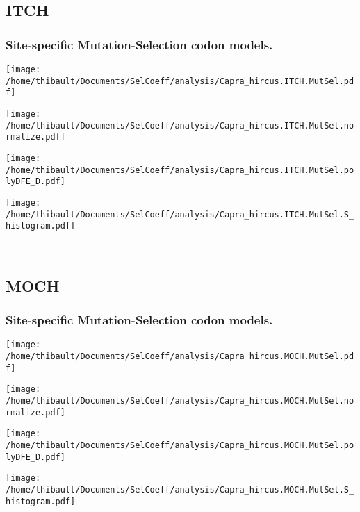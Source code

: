 \subsection{ITCH} 
 
\subsubsection*{Site-specific Mutation-Selection codon models.} 
\begin{minipage}{0.49\linewidth} 
\texttt{[image: /home/thibault/Documents/SelCoeff/analysis/Capra\_hircus.ITCH.MutSel.pdf]} 
\end{minipage}
\begin{minipage}{0.49\linewidth} 
\texttt{[image: /home/thibault/Documents/SelCoeff/analysis/Capra\_hircus.ITCH.MutSel.normalize.pdf]} 
\end{minipage}
\begin{minipage}{0.49\linewidth} 
\texttt{[image: /home/thibault/Documents/SelCoeff/analysis/Capra\_hircus.ITCH.MutSel.polyDFE\_D.pdf]} 
\end{minipage}
\begin{minipage}{0.49\linewidth} 
\texttt{[image: /home/thibault/Documents/SelCoeff/analysis/Capra\_hircus.ITCH.MutSel.S\_histogram.pdf]} 
\end{minipage}
\\ 
\subsection{MOCH} 
 
\subsubsection*{Site-specific Mutation-Selection codon models.} 
\begin{minipage}{0.49\linewidth} 
\texttt{[image: /home/thibault/Documents/SelCoeff/analysis/Capra\_hircus.MOCH.MutSel.pdf]} 
\end{minipage}
\begin{minipage}{0.49\linewidth} 
\texttt{[image: /home/thibault/Documents/SelCoeff/analysis/Capra\_hircus.MOCH.MutSel.normalize.pdf]} 
\end{minipage}
\begin{minipage}{0.49\linewidth} 
\texttt{[image: /home/thibault/Documents/SelCoeff/analysis/Capra\_hircus.MOCH.MutSel.polyDFE\_D.pdf]} 
\end{minipage}
\begin{minipage}{0.49\linewidth} 
\texttt{[image: /home/thibault/Documents/SelCoeff/analysis/Capra\_hircus.MOCH.MutSel.S\_histogram.pdf]} 
\end{minipage}
\\ 

